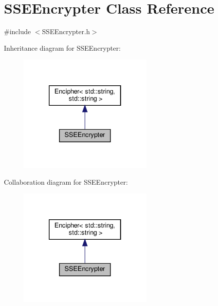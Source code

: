 \hypertarget{classSSEEncrypter}{}\section{S\+S\+E\+Encrypter Class Reference}
\label{classSSEEncrypter}


{\ttfamily \#include $<$S\+S\+E\+Encrypter.\+h$>$}



Inheritance diagram for S\+S\+E\+Encrypter\+:\nopagebreak
\begin{figure}[H]
\begin{center}
\leavevmode
\includegraphics[width=190pt]{classSSEEncrypter__inherit__graph}
\end{center}
\end{figure}


Collaboration diagram for S\+S\+E\+Encrypter\+:\nopagebreak
\begin{figure}[H]
\begin{center}
\leavevmode
\includegraphics[width=190pt]{classSSEEncrypter__coll__graph}
\end{center}
\end{figure}
